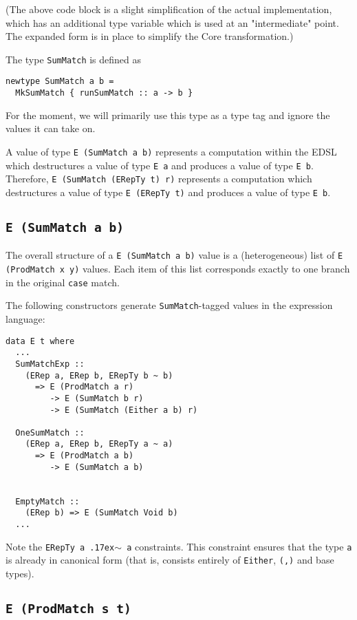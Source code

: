 \documentclass[sigplan,screen]{acmart}
\newcommand{\typeeq}{\raise.17ex\hbox{$\scriptstyle\mathtt{\sim}$}\,}
\newcommand{\ttt}{\texttt}
\begin{document}
(The above code block is a slight simplification of the actual implementation,
which has an additional type variable which is used at an "intermediate" point.
The expanded form is in place to simplify the Core transformation.)

The type \ttt{SumMatch} is defined as

\begin{lstlisting}
newtype SumMatch a b =
  MkSumMatch { runSumMatch :: a -> b }
\end{lstlisting}

For the moment, we will primarily use this type as a type tag and ignore
the values it can take on.

A value of type \ttt{E (SumMatch a b)} represents a computation within the EDSL
which destructures a value of type \ttt{E a} and produces a value of type \ttt{E b}.
Therefore, \ttt{E (SumMatch (ERepTy t) r)} represents a computation which destructures
a value of type \ttt{E (ERepTy t)} and produces a value of type \ttt{E b}.



\subsection{\ttt{E (SumMatch a b)}}

The overall structure of a \ttt{E (SumMatch a b)} value is a (heterogeneous)
list of \ttt{E (ProdMatch x y)} values.  Each item of this list corresponds
exactly to one branch in the original \ttt{case} match.

The following constructors generate \ttt{SumMatch}-tagged values in the
expression language:

\begin{lstlisting}
data E t where
  ...
  SumMatchExp ::
    (ERep a, ERep b, ERepTy b ~ b)
      => E (ProdMatch a r)
         -> E (SumMatch b r)
         -> E (SumMatch (Either a b) r)

  OneSumMatch ::
    (ERep a, ERep b, ERepTy a ~ a)
      => E (ProdMatch a b)
         -> E (SumMatch a b)


  EmptyMatch ::
    (ERep b) => E (SumMatch Void b)
  ...
\end{lstlisting}

Note the \ttt{ERepTy a \typeeq a} constraints. This constraint ensures that the type
\ttt{a} is already in canonical form (that is, consists entirely of
\ttt{Either}, \ttt{(,)} and base types).

\subsection{\ttt{E (ProdMatch s t)}}
\end{document}
